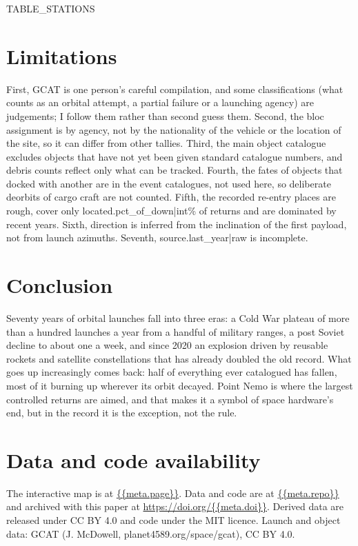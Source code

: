\documentclass[11pt,a4paper]{article}
\begin{document}
{{TABLE_STATIONS}}

\section{Limitations}
First, GCAT is one person's careful compilation, and some classifications (what counts as an orbital attempt, a partial failure or a launching agency) are judgements; I follow them rather than second guess them. Second, the bloc assignment is by agency, not by the nationality of the vehicle or the location of the site, so it can differ from other tallies. Third, the main object catalogue excludes objects that have not yet been given standard catalogue numbers, and debris counts reflect only what can be tracked. Fourth, the fates of objects that docked with another are in the event catalogues, not used here, so deliberate deorbits of cargo craft are not counted. Fifth, the recorded re-entry places are rough, cover only {{located.pct_of_down|int}}\% of returns and are dominated by recent years. Sixth, direction is inferred from the inclination of the first payload, not from launch azimuths. Seventh, {{source.last_year|raw}} is incomplete.

\section{Conclusion}
Seventy years of orbital launches fall into three eras: a Cold War plateau of more than a hundred launches a year from a handful of military ranges, a post Soviet decline to about one a week, and since 2020 an explosion driven by reusable rockets and satellite constellations that has already doubled the old record. What goes up increasingly comes back: half of everything ever catalogued has fallen, most of it burning up wherever its orbit decayed. Point Nemo is where the largest controlled returns are aimed, and that makes it a symbol of space hardware's end, but in the record it is the exception, not the rule.

\section*{Data and code availability}
The interactive map is at \url{{{meta.page}}}. Data and code are at \url{{{meta.repo}}} and archived with this paper at \url{https://doi.org/{{meta.doi}}}. Derived data are released under CC BY 4.0 and code under the MIT licence. Launch and object data: GCAT (J. McDowell, planet4589.org/space/gcat), CC BY 4.0.
\end{document}

